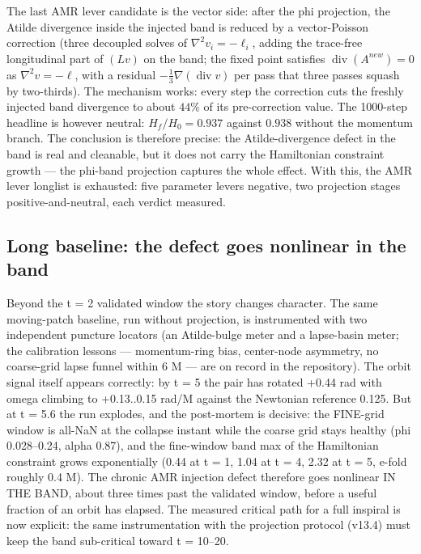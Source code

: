 The last AMR lever candidate is the vector side: after the phi
projection, the Atilde divergence inside the injected band is
reduced by a vector-Poisson correction (three decoupled solves of
$\nabla^2 v_i = -\ell_i$, adding the trace-free longitudinal part of
$(Lv)$ on the band; the fixed point satisfies
$\operatorname{div}(A^{new}) = 0$ as $\nabla^2 v = -\ell$, with a
residual $-\tfrac13\nabla(\operatorname{div} v)$ per pass that
three passes squash by two-thirds). The mechanism works: every step
the correction cuts the freshly injected band divergence to about
$44\%$ of its pre-correction value. The 1000-step headline is
however neutral: $H_f/H_0 = 0.937$ against $0.938$ without the
momentum branch. The conclusion is therefore precise: the
Atilde-divergence defect in the band is real and cleanable, but it
does not carry the Hamiltonian constraint growth — the phi-band
projection captures the whole effect. With this, the AMR lever
longlist is exhausted: five parameter levers negative, two
projection stages positive-and-neutral, each verdict measured.

\subsection{Long baseline: the defect goes nonlinear in the band}

Beyond the t = 2 validated window the story changes character. The
same moving-patch baseline, run without projection, is instrumented
with two independent puncture locators (an Atilde-bulge meter and a
lapse-basin meter; the calibration lessons --- momentum-ring bias,
center-node asymmetry, no coarse-grid lapse funnel within 6 M ---
are on record in the repository). The orbit signal itself appears
correctly: by t = 5 the pair has rotated +0.44 rad with omega
climbing to +0.13..0.15 rad/M against the Newtonian reference
0.125. But at t = 5.6 the run explodes, and the post-mortem is
decisive: the FINE-grid window is all-NaN at the collapse instant
while the coarse grid stays healthy (phi 0.028--0.24, alpha 0.87),
and the fine-window band max of the Hamiltonian constraint grows
exponentially (0.44 at t = 1, 1.04 at t = 4, 2.32 at t = 5,
e-fold roughly 0.4 M). The chronic AMR injection defect therefore
goes nonlinear IN THE BAND, about three times past the validated
window, before a useful fraction of an orbit has elapsed. The
measured critical path for a full inspiral is now explicit: the
same instrumentation with the projection protocol (v13.4) must keep
the band sub-critical toward t = 10--20.

